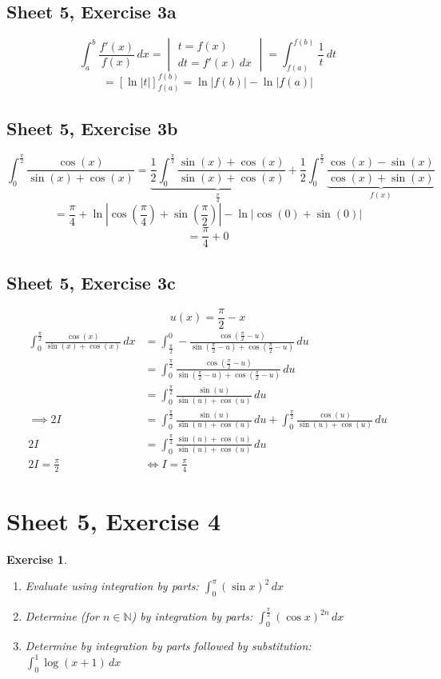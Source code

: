 \documentclass{article}
\newtheorem{ex}{Exercise} %
\newcommand{\card}[1]{\left|#1\right|}
\begin{document}
\subsection{Sheet 5, Exercise 3a}
\[ \int_a^b \frac{f'(x)}{f(x)} \, dx = \begin{vmatrix} t = f(x) \\ dt = f'(x) \, dx \end{vmatrix} = \int_{f(a)}^{f(b)} \frac{1}{t} \, dt \]
\[ = \left[\ln\card{t}\right]_{f(a)}^{f(b)} = \ln\card{f(b)} - \ln\card{f(a)} \]

\subsection{Sheet 5, Exercise 3b}
\[
  \int_0^{\frac\pi2} \frac{\cos(x)}{\sin(x) + \cos(x)} = \underbrace{\frac12 \int_0^{\frac\pi2} \frac{\sin(x) + \cos(x)}{\sin(x) + \cos(x)}}_{\frac\pi4} + \frac12 \int_0^{\frac\pi2} \underbrace{\frac{\cos(x) - \sin(x)}{\cos(x) + \sin(x)}}_{f(x)}
\] \[
  = \frac\pi4 + \ln{\card{\cos(\frac\pi4) + \sin(\frac\pi2)} - \ln\card{\cos(0) + \sin(0)}}
\] \[
  = \frac\pi4 + 0
\]

\subsection{Sheet 5, Exercise 3c}
\[ u(x) = \frac\pi2 - x \]
\begin{align*}
  \int_0^{\frac\pi2} \frac{\cos(x)}{\sin(x) + \cos(x)} \, dx
  &= \int_{\frac\pi2}^0 -\frac{\cos(\frac\pi2 - u)}{\sin(\frac\pi2 - u) + \cos(\frac\pi2 - u)} \, du \\
  &= \int_0^{\frac\pi2} \frac{\cos(\frac\pi2 - u)}{\sin(\frac\pi2 - u) + \cos(\frac\pi2 - u)} \, du \\
  &= \int_0^{\frac\pi2} \frac{\sin(u)}{\sin(u) + \cos(u)} \, du \\
  \implies 2I &= \int_0^{\frac\pi2} \frac{\sin(u)}{\sin(u) + \cos(u)} \, du + \int_0^{\frac\pi2} \frac{\cos(u)}{\sin(u) + \cos(u)} \, du \\
  2I &= \int_0^{\frac\pi2} \frac{\sin(u) + \cos(u)}{\sin(u) + \cos(u)} \, du \\
  2I = \frac\pi2 &\iff I = \frac\pi4
\end{align*}

\section{Sheet 5, Exercise 4}
\begin{ex}
  \begin{enumerate}
    \item Evaluate using integration by parts: $\int_0^\pi (\sin{x})^2 \, dx$
    \item Determine (for $n \in \mathbb N$) by integration by parts: $\int_0^{\frac\pi2} (\cos{x})^{2n} \, dx$
    \item Determine by integration by parts followed by substitution: $\int_0^1 \log(x  + 1) \, dx$
  \end{enumerate}
\end{ex}
\end{document}
